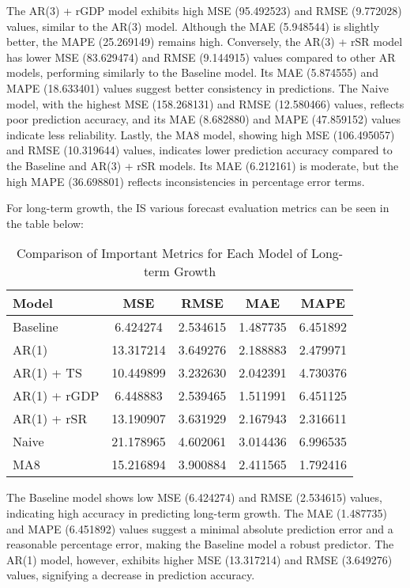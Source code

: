 \documentclass[12pt]{article}
\begin{document}
The AR(3) + rGDP model exhibits high MSE (95.492523) and RMSE (9.772028) values, similar to the AR(3) model. Although the MAE (5.948544) is slightly better, the MAPE (25.269149) remains high. Conversely, the AR(3) + rSR model has lower MSE (83.629474) and RMSE (9.144915) values compared to other AR models, performing similarly to the Baseline model. Its MAE (5.874555) and MAPE (18.633401) values suggest better consistency in predictions. The Naive model, with the highest MSE (158.268131) and RMSE (12.580466) values, reflects poor prediction accuracy, and its MAE (8.682880) and MAPE (47.859152) values indicate less reliability. Lastly, the MA8 model, showing high MSE (106.495057) and RMSE (10.319644) values, indicates lower prediction accuracy compared to the Baseline and AR(3) + rSR models. Its MAE (6.212161) is moderate, but the high MAPE (36.698801) reflects inconsistencies in percentage error terms.

For long-term growth, the IS various forecast evaluation metrics can be seen in the table below:

\begin{table}[H]
\centering
\begin{tabular}{lcccc}
\hline
Model & MSE & RMSE & MAE & MAPE \\
\hline
Baseline & 6.424274 & 2.534615 & 1.487735 & 6.451892 \\
AR(1) & 13.317214 & 3.649276 & 2.188883 & 2.479971 \\
AR(1) + TS & 10.449899 & 3.232630 & 2.042391 & 4.730376 \\
AR(1) + rGDP & 6.448883 & 2.539465 & 1.511991 & 6.451125 \\
AR(1) + rSR & 13.190907 & 3.631929 & 2.167943 & 2.316611 \\
Naive & 21.178965 & 4.602061 & 3.014436 & 6.996535 \\
MA8 & 15.216894 & 3.900884 & 2.411565 & 1.792416 \\
\hline
\end{tabular}
\caption{Comparison of Important Metrics for Each Model of Long-term Growth}
\label{tab:model_comparison_lt}
\end{table}

The Baseline model shows low MSE (6.424274) and RMSE (2.534615) values, indicating high accuracy in predicting long-term growth. The MAE (1.487735) and MAPE (6.451892) values suggest a minimal absolute prediction error and a reasonable percentage error, making the Baseline model a robust predictor. The AR(1) model, however, exhibits higher MSE (13.317214) and RMSE (3.649276) values, signifying a decrease in prediction accuracy.
\end{document}

